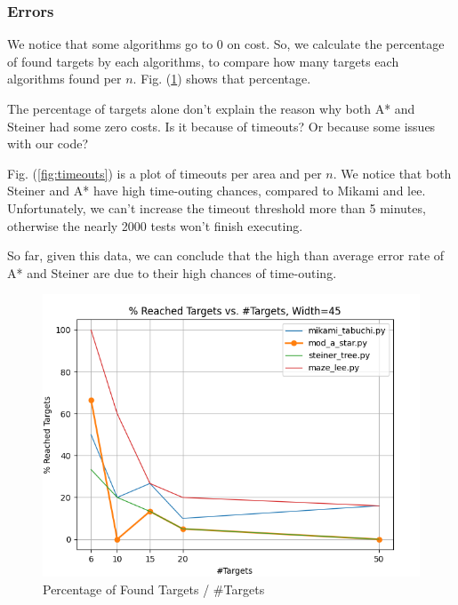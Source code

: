 \subsubsection{Errors}
We notice that some algorithms go to $0$ on cost. So, we calculate the percentage of found targets by each algorithms, to compare how many targets each algorithms found per $n$. Fig. (\ref{fig:percTargets}) shows that percentage.

The percentage of targets alone don't explain the reason why both A* and Steiner had some zero costs. Is it because of timeouts? Or because some issues with our code?

Fig. (\ref{fig:timeouts}) is a plot of timeouts per area and per $n$. We notice that both Steiner and A* have high time-outing chances, compared to Mikami and lee. Unfortunately, we can't increase the timeout threshold more than 5 minutes, otherwise the nearly 2000 tests won't finish executing.

So far, given this data, we can conclude that the high than average error rate of A* and Steiner are due to their high chances of time-outing.

\begin{figure}
\centering
\includegraphics[width=\linewidth]{figures/plots/percTargets_areaConst.png}
\caption{Percentage of Found Targets / \#Targets}
\label{fig:percTargets}
\end{figure}

